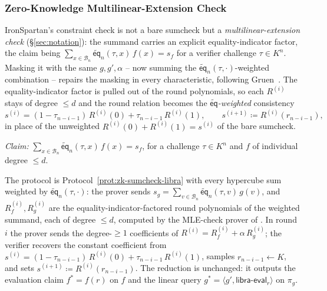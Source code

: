 \documentclass{article}
\theoremstyle{definition}
\newcommand*{\mle}{\widetilde}
\newcommand{\eq}{\mathsf{eq}}
\newcommand{\BB}{\mathcal{B}}
\begin{document}
\subsubsection{Zero-Knowledge Multilinear-Extension Check}
\label{sec:zk-mle-check}

IronSpartan's constraint check is not a bare sumcheck but a \emph{multilinear-extension check} (\S\ref{sec:notation}): the summand carries an explicit equality-indicator factor, the claim being $\sum_{x \in \BB_n} \mle{\eq}_n(\tau, x)\, f(x) = s_f$ for a verifier challenge $\tau \in K^n$. Masking it with the same $g, g', \alpha$ -- now summing the $\mle{\eq}_n(\tau, \cdot)$-weighted combination -- repairs the masking in every characteristic, following Gruen~\cite{Gruen:2024aa}. The equality-indicator factor is pulled out of the round polynomials, so each $R^{(i)}$ stays of degree $\le d$ and the round relation becomes the \emph{$\mle{\eq}$-weighted} consistency
\[
  s^{(i)} = (1 - \tau_{n - i - 1})\, R^{(i)}(0) + \tau_{n - i - 1}\, R^{(i)}(1), \qquad s^{(i + 1)} \coloneqq R^{(i)}(r_{n - i - 1}),
\]
in place of the unweighted $R^{(i)}(0) + R^{(i)}(1) = s^{(i)}$ of the bare sumcheck.

\begin{protocol}
\label{prot:zk-mle-check}
\emph{Claim:} $\sum_{x \in \BB_n} \mle{\eq}_n(\tau, x)\, f(x) = s_f$, for a challenge $\tau \in K^n$ and $f$ of individual degree $\le d$.

The protocol is Protocol~\ref{prot:zk-sumcheck-libra} with every hypercube sum weighted by $\mle{\eq}_n(\tau, \cdot)$: the prover sends $s_g = \sum_{v \in \BB_n} \mle{\eq}_n(\tau, v)\, g(v)$, and $R_f^{(i)}, R_g^{(i)}$ are the equality-indicator-factored round polynomials of the weighted summand, each of degree $\le d$, computed by the MLE-check prover of \cite{Gruen:2024aa}. In round $i$ the prover sends the degree-$\ge 1$ coefficients of $R^{(i)} = R_f^{(i)} + \alpha\, R_g^{(i)}$; the verifier recovers the constant coefficient from $s^{(i)} = (1 - \tau_{n - i - 1})\, R^{(i)}(0) + \tau_{n - i - 1}\, R^{(i)}(1)$, samples $r_{n - i - 1} \gets K$, and sets $s^{(i + 1)} \coloneqq R^{(i)}(r_{n - i - 1})$. The reduction is unchanged: it outputs the evaluation claim $f^* = f(r)$ on $f$ and the linear query $g^* = \langle g', \textsf{libra-eval}_r \rangle$ on $\pi_g$.
\end{protocol}
\end{document}
